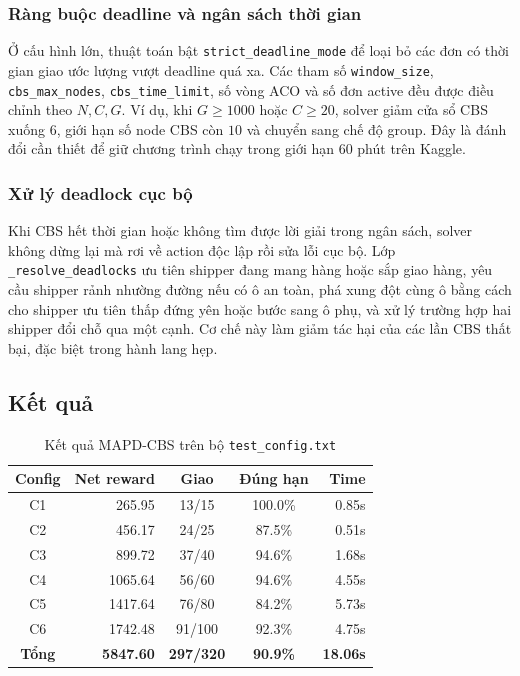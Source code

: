 \documentclass[conference]{IEEEtran}
\begin{document}
\subsubsection{Ràng buộc deadline và ngân sách thời gian}
Ở cấu hình lớn, thuật toán bật \texttt{strict\_deadline\_mode} để loại bỏ các đơn có thời gian giao ước lượng vượt deadline quá xa. Các tham số \texttt{window\_size}, \texttt{cbs\_max\_nodes}, \texttt{cbs\_time\_limit}, số vòng ACO và số đơn active đều được điều chỉnh theo $N, C, G$. Ví dụ, khi $G \ge 1000$ hoặc $C \ge 20$, solver giảm cửa sổ CBS xuống $6$, giới hạn số node CBS còn $10$ và chuyển sang chế độ group. Đây là đánh đổi cần thiết để giữ chương trình chạy trong giới hạn 60 phút trên Kaggle.

\subsubsection{Xử lý deadlock cục bộ}
Khi CBS hết thời gian hoặc không tìm được lời giải trong ngân sách, solver không dừng lại mà rơi về action độc lập rồi sửa lỗi cục bộ. Lớp \texttt{\_resolve\_deadlocks} ưu tiên shipper đang mang hàng hoặc sắp giao hàng, yêu cầu shipper rảnh nhường đường nếu có ô an toàn, phá xung đột cùng ô bằng cách cho shipper ưu tiên thấp đứng yên hoặc bước sang ô phụ, và xử lý trường hợp hai shipper đổi chỗ qua một cạnh. Cơ chế này làm giảm tác hại của các lần CBS thất bại, đặc biệt trong hành lang hẹp.

\subsection{Kết quả}
\begin{table}[htbp]
\caption{Kết quả MAPD-CBS trên bộ \texttt{test\_config.txt}}
\label{tab:mapd-cbs-phase1}
\centering
\footnotesize
\begin{tabular}{|c|r|c|c|r|}
\hline
\textbf{Config} & \textbf{Net reward} & \textbf{Giao} & \textbf{Đúng hạn} & \textbf{Time} \\
\hline
C1 & 265.95 & 13/15 & 100.0\% & 0.85s \\
C2 & 456.17 & 24/25 & 87.5\% & 0.51s \\
C3 & 899.72 & 37/40 & 94.6\% & 1.68s \\
C4 & 1065.64 & 56/60 & 94.6\% & 4.55s \\
C5 & 1417.64 & 76/80 & 84.2\% & 5.73s \\
C6 & 1742.48 & 91/100 & 92.3\% & 4.75s \\
\hline
\textbf{Tổng} & \textbf{5847.60} & \textbf{297/320} & \textbf{90.9\%} & \textbf{18.06s} \\
\hline
\end{tabular}
\end{table}
\end{document}
